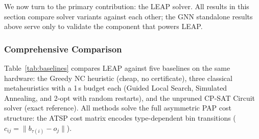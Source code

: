 \documentclass[conference]{IEEEtran}
\begin{document}
We now turn to the primary contribution: the LEAP solver. All results in this section compare solver variants against each other; the GNN standalone results above serve only to validate the component that powers LEAP.

\subsubsection{Comprehensive Comparison}\label{sec:baselines}

Table~\ref{tab:baselines} compares LEAP against five baselines on the same hardware: the Greedy NC heuristic (cheap, no certificate), three classical metaheuristics with a 1\,s budget each (Guided Local Search, Simulated Annealing, and 2-opt with random restarts), and the unpruned CP-SAT Circuit solver (exact reference). All methods solve the full asymmetric PAP cost structure: the ATSP cost matrix encodes type-dependent bin transitions ($c_{ij} = \lVert b_{\tau(i)} - o_j \rVert$).
\end{document}
